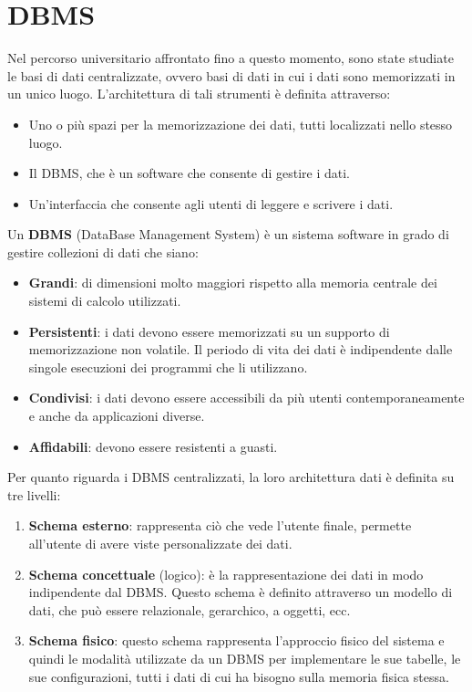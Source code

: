 \chapter{DBMS}
Nel percorso universitario affrontato fino a questo momento, sono state studiate
le basi di dati centralizzate, ovvero basi di dati in cui i dati sono memorizzati
in un unico luogo. L'architettura di tali strumenti è definita attraverso:
\begin{itemize}
    \item Uno o più spazi per la memorizzazione dei dati, tutti localizzati nello
          stesso luogo.
    \item Il DBMS, che è un software che consente di gestire i dati.
    \item Un'interfaccia che consente agli utenti di leggere e scrivere i dati.
\end{itemize}
\begin{definizione}
      Un \textbf{DBMS} (DataBase Management System) è un sistema software in grado
      di gestire collezioni di dati che siano:
      \begin{itemize}
            \item \textbf{Grandi}: di dimensioni molto maggiori rispetto alla memoria
                  centrale dei sistemi di calcolo utilizzati.
            \item \textbf{Persistenti}: i dati devono essere memorizzati su un
                  supporto di memorizzazione non volatile. Il periodo di vita dei
                  dati è indipendente dalle singole esecuzioni dei programmi che li
                  utilizzano.
            \item \textbf{Condivisi}: i dati devono essere accessibili da più utenti
                  contemporaneamente e anche da applicazioni diverse.
            \item \textbf{Affidabili}: devono essere resistenti a guasti.
      \end{itemize}
\end{definizione}
Per quanto riguarda i DBMS centralizzati, la loro architettura dati è definita 
su tre livelli:
\begin{enumerate}
    \item \textbf{Schema esterno}: rappresenta ciò che vede l'utente finale,
          permette all'utente di avere viste personalizzate dei dati.
    \item \textbf{Schema concettuale} (logico): è la rappresentazione dei dati in modo
          indipendente dal DBMS. Questo schema è definito attraverso un modello
          di dati, che può essere relazionale, gerarchico, a oggetti, ecc.
    \item \textbf{Schema fisico}: questo schema rappresenta l'approccio fisico
          del sistema e quindi le modalità utilizzate da un DBMS per implementare
          le sue tabelle, le sue configurazioni, tutti i dati di cui ha bisogno
          sulla memoria fisica stessa.
\end{enumerate}
